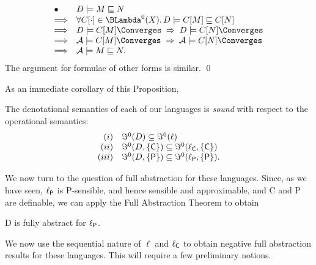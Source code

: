 \proof 
\[ \begin{array}{ll}
\bullet & D \models M \sqsubseteq N \\
\Longrightarrow & \forall C[ \cdot ] \in {\BLambda}^{0}(X). \, D \models C[M] \sqsubseteq C[N] \\
\Longrightarrow & D \models C[M] \Converges \; \Rightarrow \; D \models C[N] \Converges \\
\Longrightarrow & {\cal A} \models C[M] \Converges \; \Rightarrow \; {\cal A} \models C[N] \Converges \\
\Longrightarrow & {\cal A} \models M \sqsubseteq N .
\end{array} \]
The argument for formulae of other forms is similar. \qed

As an immediate corollary of this Proposition,
\begin{proposition}
The denotational semantics of each of our languages is {\em sound} with respect to
the operational semantics:
\[ \begin{array}{rl}
(i) & {\Im}^{0}(D) \subseteq {\Im}^{0}(\ell ) \\
(ii) &  {\Im}^{0}(D, \{ {\sf C} \} ) \subseteq {\Im}^{0}(\ell_{\sf C}, \{ {\sf C} \} ) \\
(iii) & {\Im}^{0}(D, \{ {\sf P} \} ) \subseteq {\Im}^{0}(\ell_{\sf P}, \{ {\sf P} \} ) . 
\end{array} \]
\end{proposition}

We now turn to the question of full abstraction for these languages. Since, as we have seen, $\ell_{\sf P}$ is {\sf P}-sensible, and hence sensible and approximable, and {\sf C} and {\sf P} are definable, we can apply the Full Abstraction Theorem to obtain
\begin{proposition}
D is fully abstract for $\ell_{\sf P}$.
\end{proposition}

We now use the sequential nature of $\ell$ and $\ell_{\sf C}$ to obtain negative full abstraction results for these languages. This will require a few preliminary notions.

